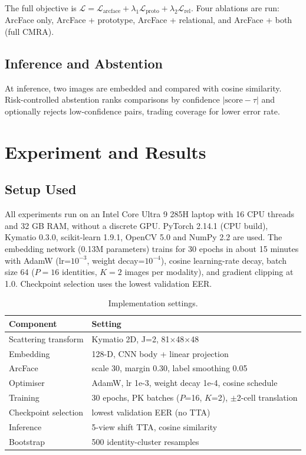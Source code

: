 \documentclass[12pt,a4paper]{article}
\begin{document}
The full objective is $\mathcal{L} = \mathcal{L}_{\text{arcface}} + \lambda_1\mathcal{L}_{\text{proto}} + \lambda_2\mathcal{L}_{\text{rel}}$. Four ablations are run: ArcFace only, ArcFace + prototype, ArcFace + relational, and ArcFace + both (full CMRA).

\subsection{Inference and Abstention}
At inference, two images are embedded and compared with cosine similarity. Risk-controlled abstention ranks comparisons by confidence $|\text{score} - \tau|$ and optionally rejects low-confidence pairs, trading coverage for lower error rate.

\section{Experiment and Results}

\subsection{Setup Used}
All experiments run on an Intel Core Ultra 9 285H laptop with 16 CPU threads and 32 GB RAM, without a discrete GPU. PyTorch 2.14.1 (CPU build), Kymatio 0.3.0, scikit-learn 1.9.1, OpenCV 5.0 and NumPy 2.2 are used. The embedding network (0.13M parameters) trains for 30 epochs in about 15 minutes with AdamW (lr=$10^{-3}$, weight decay=$10^{-4}$), cosine learning-rate decay, batch size 64 ($P=16$ identities, $K=2$ images per modality), and gradient clipping at 1.0. Checkpoint selection uses the lowest validation EER.

\begin{table}[H]
    \centering
    \caption{Implementation settings.}
    \label{tab:settings}
    \begin{tabular}{ll}
    \toprule
    Component & Setting \\
    \midrule
    Scattering transform & Kymatio 2D, J=2, 81$\times$48$\times$48 \\
    Embedding & 128-D, CNN body + linear projection \\
    ArcFace & scale 30, margin 0.30, label smoothing 0.05 \\
    Optimiser & AdamW, lr 1e-3, weight decay 1e-4, cosine schedule \\
    Training & 30 epochs, PK batches ($P$=16, $K$=2), $\pm$2-cell translation \\
    Checkpoint selection & lowest validation EER (no TTA) \\
    Inference & 5-view shift TTA, cosine similarity \\
    Bootstrap & 500 identity-cluster resamples \\
    \bottomrule
    \end{tabular}
\end{table}
\end{document}
